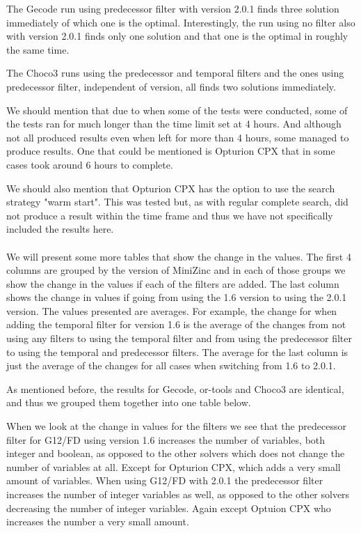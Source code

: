The Gecode run using predecessor filter with version 2.0.1 finds three solution immediately of which one is the optimal. Interestingly, the run using no filter also with version 2.0.1 finds only one solution and that one is the optimal in roughly the same time.

The Choco3 runs using the predecessor and temporal filters and the ones using predecessor filter, independent of version, all finds two solutions immediately.

We should mention that due to when some of the tests were conducted, some of the tests ran for much longer than the time limit set at 4 hours. And although not all produced results even when left for more than 4 hours, some managed to produce results. One that could be mentioned is Opturion CPX that in some cases took around 6 hours to complete.

We should also mention that Opturion CPX has the option to use the search strategy "warm start". This was tested but, as with regular complete search, did not produce a result within the time frame and thus we have not specifically included the results here.
\\\\
We will present some more tables that show the change in the values. The first 4 columns are grouped by the version of MiniZinc and in each of those groups we show the change in the values if each of the filters are added. The last column shows the change in values if going from using the 1.6 version to using the 2.0.1 version. The values presented are averages. For example, the change for when adding the temporal filter for version 1.6 is the average of the changes from not using any filters to using the temporal filter and from using the predecessor filter to using the temporal and predecessor filters. The average for the last column is just the average of the changes for all cases when switching from 1.6 to 2.0.1.

As mentioned before, the results for Gecode, or-tools and Choco3 are identical, and thus we grouped them together into one table below.









When we look at the change in values for the filters we see that the predecessor filter for G12/FD using version 1.6 increases the number of variables, both integer and boolean, as opposed to the other solvers which does not change the number of variables at all. Except for Opturion CPX, which adds a very small amount of variables. When using G12/FD with 2.0.1 the predecessor filter increases the number of integer variables as well, as opposed to the other solvers decreasing the number of integer variables. Again except Optuion CPX who increases the number a very small amount.

